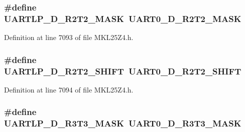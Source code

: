 \subsubsection[{\texorpdfstring{U\+A\+R\+T\+L\+P\+\_\+\+D\+\_\+\+R2\+T2\+\_\+\+M\+A\+SK}{UARTLP_D_R2T2_MASK}}]{\setlength{\rightskip}{0pt plus 5cm}\#define U\+A\+R\+T\+L\+P\+\_\+\+D\+\_\+\+R2\+T2\+\_\+\+M\+A\+SK~{\bf U\+A\+R\+T0\+\_\+\+D\+\_\+\+R2\+T2\+\_\+\+M\+A\+SK}}\hypertarget{group___backward___compatibility___symbols_ga5e511688ca9d65b6f298ecf4c9983f92}{}\label{group___backward___compatibility___symbols_ga5e511688ca9d65b6f298ecf4c9983f92}


Definition at line 7093 of file M\+K\+L25\+Z4.\+h.

\subsubsection[{\texorpdfstring{U\+A\+R\+T\+L\+P\+\_\+\+D\+\_\+\+R2\+T2\+\_\+\+S\+H\+I\+FT}{UARTLP_D_R2T2_SHIFT}}]{\setlength{\rightskip}{0pt plus 5cm}\#define U\+A\+R\+T\+L\+P\+\_\+\+D\+\_\+\+R2\+T2\+\_\+\+S\+H\+I\+FT~{\bf U\+A\+R\+T0\+\_\+\+D\+\_\+\+R2\+T2\+\_\+\+S\+H\+I\+FT}}\hypertarget{group___backward___compatibility___symbols_ga9c26b19d89d75331664cd34366569eaa}{}\label{group___backward___compatibility___symbols_ga9c26b19d89d75331664cd34366569eaa}


Definition at line 7094 of file M\+K\+L25\+Z4.\+h.

\subsubsection[{\texorpdfstring{U\+A\+R\+T\+L\+P\+\_\+\+D\+\_\+\+R3\+T3\+\_\+\+M\+A\+SK}{UARTLP_D_R3T3_MASK}}]{\setlength{\rightskip}{0pt plus 5cm}\#define U\+A\+R\+T\+L\+P\+\_\+\+D\+\_\+\+R3\+T3\+\_\+\+M\+A\+SK~{\bf U\+A\+R\+T0\+\_\+\+D\+\_\+\+R3\+T3\+\_\+\+M\+A\+SK}}\hypertarget{group___backward___compatibility___symbols_ga147acf9d25c9aed961994759b4a09adf}{}\label{group___backward___compatibility___symbols_ga147acf9d25c9aed961994759b4a09adf}


